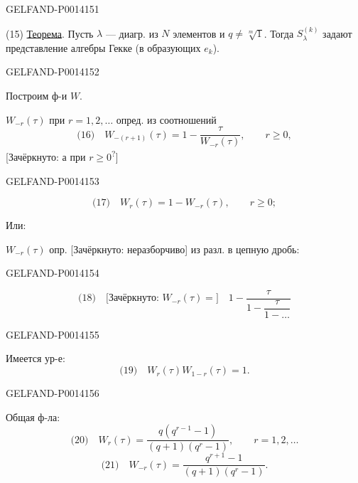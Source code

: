 \begin{GelfandAdjacentEvidence}{GELFAND-P001415}{1}

(15) \uline{Теорема}. Пусть \(\lambda\) — диагр. из \(N\) элементов и
\(q\ne\sqrt[m]{1}\). Тогда \(S_{\lambda}^{(k)}\) задают представление алгебры Гекке
(в образующих \(e_k\)).
\end{GelfandAdjacentEvidence}
\begin{GelfandAdjacentEvidence}{GELFAND-P001415}{2}


Построим ф-и \(W\).

\(W_{-r}(\tau)\) при \(r=1,2,\ldots\) опред. из соотношений
\[
\text{(16)}\quad W_{-(r+1)}(\tau)=1-\frac{\tau}{W_{-r}(\tau)},
\qquad r\geqslant0,
\]
[Зачёркнуто: а при \(r\geqslant0\)\textsuperscript{?}]
\end{GelfandAdjacentEvidence}
\begin{GelfandAdjacentEvidence}{GELFAND-P001415}{3}

\[
\text{(17)}\quad W_r(\tau)=1-W_{-r}(\tau),\qquad r\geqslant0;
\]

Или:

\(W_{-r}(\tau)\) опр. [Зачёркнуто: неразборчиво] из разл. в цепную дробь:
\end{GelfandAdjacentEvidence}
\begin{GelfandAdjacentEvidence}{GELFAND-P001415}{4}


\[
\text{(18)}\quad \text{[Зачёркнуто: }W_{-r}(\tau)=\text{]}\quad
1-\frac{\tau}{1-\dfrac{\tau}{1-\ldots}}
\]
\end{GelfandAdjacentEvidence}
\begin{GelfandAdjacentEvidence}{GELFAND-P001415}{5}


Имеется ур-е:
\[
\text{(19)}\quad W_r(\tau)W_{1-r}(\tau)=1.
\]
\end{GelfandAdjacentEvidence}
\begin{GelfandAdjacentEvidence}{GELFAND-P001415}{6}


Общая ф-ла:
\[
\text{(20)}\quad W_r(\tau)=\frac{q(q^{r-1}-1)}{(q+1)(q^r-1)},\qquad r=1,2,\ldots
\]
\[
\text{(21)}\quad W_{-r}(\tau)=\frac{q^{r+1}-1}{(q+1)(q^r-1)}.
\]
\end{GelfandAdjacentEvidence}
